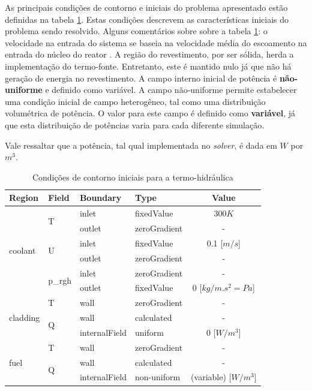 As principais condições de contorno e iniciais do problema apresentado estão definidas na tabela \ref{tab:cc-init}.
Estas condições descrevem as características iniciais do problema sendo resolvido. Alguns comentários sobre sobre
a tabela \ref{tab:cc-init}: o velocidade na entrada do sistema se baseia na velocidade média do escoamento na
entrada do núcleo do reator \cite{Veloso2005}. A região do revestimento, por ser sólida, herda a implementação
do termo-fonte. Entretanto, este é mantido nulo já que não há geração de energia no revestimento. A campo
interno inicial de potência é \textbf{não-uniforme} e definido como variável. A campo não-uniforme permite estabelecer
uma condição inicial de campo heterogêneo, tal como uma distribuição volumétrica de potência. O valor para este
campo é definido como \textbf{variável}, já que esta distribuição de potências varia para cada diferente simulação.

Vale ressaltar que a potência, tal qual implementada no \textit{solver}, é dada em $W$ por $m^3$.

\begin{table}[htb]
\centering
\caption{Condições de contorno iniciais para a termo-hidráulica}
\label{tab:cc-init}
\begin{tabular}{llllc}
Region                    & Field                   & Boundary      & Type         & Value                 \\
\hline
\multirow{6}{*}{coolant}  & \multirow{2}{*}{T}      & inlet         & fixedValue   & $300K$                  \\
                          &                         & outlet        & zeroGradient & -                     \\
                          & \multirow{2}{*}{U}      & inlet         & fixedValue   & 0.1 {[}$m/s${]}         \\
                          &                         & outlet        & zeroGradient & -                     \\
                          & \multirow{2}{*}{p\_rgh} & inlet         & zeroGradient & -                     \\
                          &                         & outlet        & fixedValue   & 0 {[}$kg/m.s^2 = Pa${]}  \\
\hline
\multirow{3}{*}{cladding} & T                       & wall          & zeroGradient & -                     \\
                          & \multirow{2}{*}{Q}      & wall          & calculated   & -                     \\
                          &                         & internalField & uniform      & 0 {[}$W/m^3${]}          \\
\hline
\multirow{3}{*}{fuel}     & T                       & wall          & zeroGradient & -                     \\
                          & \multirow{2}{*}{Q}      & wall          & calculated   & -                     \\
                          &                         & internalField & non-uniform  & (variable) {[}$W/m^3${]}
\end{tabular}
\end{table}

